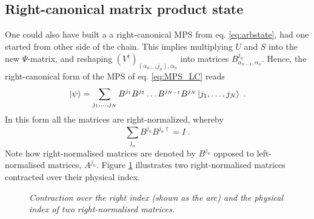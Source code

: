 \subsection{Right-canonical matrix product state}
One could also have built a a right-canonical MPS from eq. \eqref{eq:arbstate}, had one started from other side of the chain. This implies multiplying $U$ and $S$ into the new $\Psi$-matrix, and reshaping $(V^{\dag})_{(\alpha_{n-1} j_n), \alpha_n}$ into matrices $B_{\alpha_{n-1} , \alpha_n}^{j_n}$. Hence, the right-canonical form of the MPS of eq. \eqref{eq:MPS_LC} reads
\begin{equation}
	\ket{\psi} = \sum_{j_1, \ldots, j_N} B^{j_1} B^{j_2} \ldots B^{j_{N-1}} B^{j_{N}} \ket{j_1, \ldots, j_N} \; .
\label{eq:MPS_RC}	 
\end{equation}
In this form all the matrices are right-normalized, whereby 
\begin{equation}
	\sum_{j_n} B^{j_n} B^{j_n \dag} = I \; .
	\label{eq:RC_ident}
\end{equation}
Note how right-normalised matrices are denoted by $B^{j_n}$ opposed to left-normalised matrices, $A^{j_n}$.
Figure \ref{fig:rightNorm} illustrates two right-normalised matrices contracted over their physical index.
\begin{figure}[h!]
	\centering
	
	\caption{\textit{Contraction over the right index (shown as the arc) and the physical index of two right-normalised matrices.}}
	\label{fig:rightNorm}
\end{figure}


